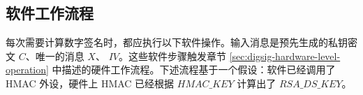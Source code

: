 \documentclass[main\_\_CN.tex]{subfiles}
\begin{document}
\subsection{软件工作流程}

每次需要计算数字签名时，都应执行以下软件操作。输入消息是预先生成的私钥密文 \begin{math}C\end{math}、唯一的消息 \begin{math}X\end{math}、 \begin{math}IV\end{math}。这些软件步骤触发章节 \ref{sec:digsig-hardware-level-operation} 中描述的硬件工作流程。下述流程基于一个假设：软件已经调用了 HMAC 外设，硬件上 HMAC 已经根据 \begin{math}HMAC\_KEY\end{math} 计算出了 \begin{math}RSA\_DS\_KEY\end{math}。
\end{document}
